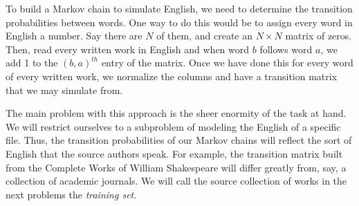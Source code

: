 To build a Markov chain to simulate English, we need to determine the transition probabilities between words.
One way to do this would be to assign every word in English a number.
Say there are $N$ of them, and create an $N\times N$ matrix of zeros.
Then, read every written work in English and when word $b$ follows word $a$, we add 1 to the $(b,a)^{th}$ entry of the matrix.
Once we have done this for every word of every written work, we normalize the columns and have a transition matrix that we may simulate from.

The main problem with this approach is the sheer enormity of the task at hand.
We will restrict ourselves to a subproblem of modeling the English of a specific file.
Thus, the transition probabilities of our Markov chains will reflect the sort of English that the source authors speak.
For example, the transition matrix built from the Complete Works of William Shakespeare will differ greatly from, say, a collection of academic journals.
We will call the source collection of works in the next problems the \emph{training set}.


